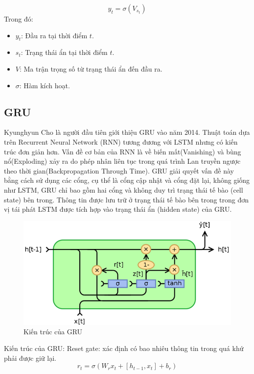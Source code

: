 \documentclass[conference]{IEEEtran}
\begin{document}
\[y_t = \sigma(V_{s_{t}})\]
Trong đó:
\begin{itemize}
    \item \( y_t \): Đầu ra tại thời điểm \( t \).
    \item \( s_{t} \): Trạng thái ẩn tại thời điểm \( t \).
    \item \( V \): Ma trận trọng số từ trạng thái ẩn đến đầu ra.
    \item $\sigma$: Hàm kích hoạt. 
\end{itemize}

\subsection{GRU}
Kyunghyun Cho là người đầu tiên giới thiệu GRU vào năm 2014. Thuật toán dựa trên Recurrent Neural Network (RNN) tương đương với LSTM nhưng có kiến trúc đơn giản hơn. Vấn đề cơ bản của RNN là về biến mất(Vanishing) và bùng nổ(Exploding) xảy ra do phép nhân liên tục trong quá trình Lan truyền ngược theo thời gian(Backpropagation Through Time). GRU giải quyết vấn đề này bằng cách sử dụng các cổng, cụ thể là cổng cập nhật và cổng đặt lại, không giống như LSTM, GRU chỉ bao gồm hai cổng và không duy trì trạng thái tế bào (cell state) bên trong. Thông tin được lưu trữ ở trạng thái tế bào bên trong trong đơn vị tái phát LSTM được tích hợp vào trạng thái ẩn (hidden state) của GRU. \cite{ComparisonGRU&ARIMA}
\begin{figure}[H]
    \centering
    \begin{minipage}{0.8\linewidth}
    \centering
        \includegraphics[width=\linewidth]{images/GRU.png}
    \caption{Kiến trúc của GRU}
    \label{fig8}
    \end{minipage}
\end{figure}
Kiến trúc của GRU:
Reset gate: xác định có bao nhiêu thông tin trong quá khứ phải được giữ lại.
\[r_t = \sigma(W_r x_t + [h_{t-1}, x_t] + b_r)\]
\end{document}
